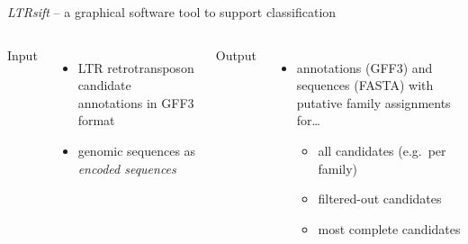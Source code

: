 \documentclass[final]{beamer}
\begin{document}
\begin{frame}[fragile]
\begin{columns}[t]
\begin{column}{.45\linewidth}
      \begin{block}{\emph{LTRsift} -- a graphical software tool to support
                    classification}
        \vspace{5mm}
        \begin{columns}
            \alert{Input}
            \begin{itemize}
              \item LTR retrotransposon candidate annotations in GFF3 format
              \item genomic sequences as \emph{encoded sequences}~\cite{STEI:KUR:2012}
            \end{itemize}
            \vspace{1cm}
            \alert{Output}
            \begin{itemize}
              \item annotations (GFF3) and sequences (FASTA) with putative
              family assignments for\dots
              \begin{itemize}
                \item all candidates (e.g.\ per family)
                \item filtered-out candidates
                \item most complete candidates
              \end{itemize}
            \end{itemize}
          \end{columns}
      \end{block}


\end{column}
\end{columns}
\end{frame}
\end{document}
